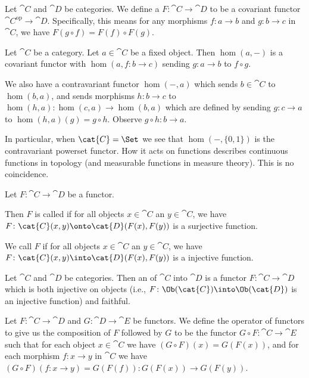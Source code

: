 \begin{definition}
Let $\cat{C}$ and $\cat{D}$ be categories.
We define a  $F\colon\cat{C}\to\cat{D}$
to be a covariant functor
$\cat{C}^{\text{op}}\to\cat{D}$. Specifically, this means for any
morphisms $f\colon a\to b$ and $g\colon b\to c$ in $\cat{C}$, we have
$F(g\circ f)=F(f)\circ F(g)$.
\end{definition}

\begin{example}
Let $\cat{C}$ be a category. Let $a\in\cat{C}$ be a fixed object.
Then $\hom(a,-)$ is a covariant functor with $\hom(a,f\colon b\to c)$
sending $g\colon a\to b$ to $f\circ g$.

We also have a contravariant functor $\hom(-,a)$ which sends
$b\in\cat{C}$ to $\hom(b,a)$, and sends morphisms $h\colon b\to c$ to
$\hom(h,a)\colon\hom(c,a)\to\hom(b,a)$ which are defined by sending
$g\colon c\to a$ to $\hom(h,a)(g)=g\circ h$. Observe $g\circ h\colon b\to a$.

In particular, when $\cat{C}=\Set$ we see that $\hom(-,\{0,1\})$ is
the contravariant powerset functor. How it acts on functions describes
continuous functions in topology (and measurable functions in measure
theory). This is no coincidence.
\end{example}

\begin{definition}
Let $F\colon\cat{C}\to\cat{D}$ be a functor.

Then $F$ is called  if for
all objects $x\in\cat{C}$ an $y\in\cat{C}$, we have $F\colon\cat{C}(x,y)\onto\cat{D}(F(x),F(y))$
is a surjective function.

We call $F$  if for
all objects $x\in\cat{C}$ an $y\in\cat{C}$, we have $F\colon\cat{C}(x,y)\into\cat{D}(F(x),F(y))$
is a injective function.
\end{definition}

\begin{definition}
Let $\cat{C}$ and $\cat{D}$ be categories.
Then an  of $\cat{C}$ into $\cat{D}$ is a functor
$F\colon\cat{C}\to\cat{D}$ which is both injective on objects (i.e.,
$F\colon\Ob(\cat{C})\into\Ob(\cat{D})$ is an injective function) and faithful.
\end{definition}

\begin{definition}
Let $F\colon\cat{C}\to\cat{D}$ and $G\colon\cat{D}\to\cat{E}$ be functors.
We define the  operator of functors to give us the
composition of $F$ followed by $G$ to be the functor $G\circ F\colon\cat{C}\to\cat{E}$
such that for each object $x\in\cat{C}$ we have $(G\circ F)(x)=G(F(x))$,
and for each morphism $f\colon x\to y$ in $\cat{C}$ we have
$(G\circ F)(f\colon x\to y)=G(F(f))\colon G(F(x))\to G(F(y))$.
\end{definition}

